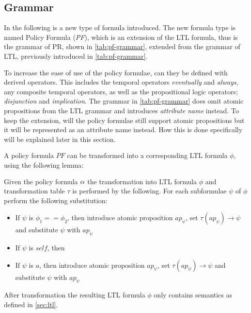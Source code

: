 \subsection{Grammar}\label{sec:grammar}
In the following is a new type of formula introduced. The new formula type is named Policy Formula (\emph{PF}), which is an extension of the LTL formula, thus is the grammar of PR, shown in \autoref{tab:pf-grammar}, extended from the grammar of LTL, previously introduced in \autoref{tab:pf-grammar}.


To increase the ease of use of the policy formulae, can they be defined with derived operators. This includes the temporal operators \emph{eventually} and \emph{always}, any composite temporal operators, as well as the propositional logic operators; \emph{disjunction} and \emph{implication}. The grammar in \autoref{tab:pf-grammar} does omit atomic propositions from the LTL grammar and introduces \emph{attribute name} instead. To keep the extension, will the policy formulae still support atomic propositions but it will be represented as an attribute name instead. How this is done specifically will be explained later in this section.

A policy formula $PF$ can be transformed into a corresponding LTL formula $\phi$, using the following lemma:
\begin{lemma}\label{lemma:pf-to-ltl}
Given the policy formula $\alpha$ the transformation into LTL formula $\phi$ and transformation table $\tau$ is performed by the following. For each subformulae $\psi$ of $\phi$ perform the following substitution:
\begin{itemize}
    \item If $\psi$ is $\phi_1 == \phi_2$, then introduce atomic proposition $ap_\psi$, set $\tau(ap_\psi) \rightarrow \psi$ and substitute $\psi$ with $ap_\psi$
    \item If $\psi$ is $self$, then 
    \item If $\psi$ is $a$, then introduce atomic proposition $ap_\psi$, set $\tau(ap_\psi) \rightarrow \psi$ and substitute $\psi$ with $ap_\psi$
\end{itemize}
After transformation the resulting LTL formula $\phi$ only contains semantics as defined in \autoref{sec:ltl}.
\end{lemma}



